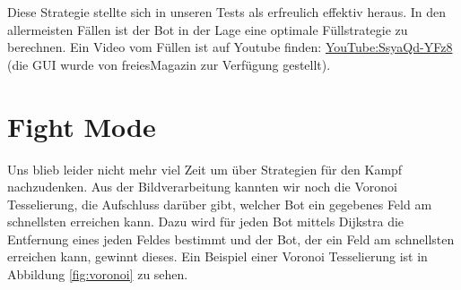 Diese Strategie stellte sich in unseren Tests als erfreulich effektiv heraus.
In den allermeisten Fällen ist der Bot in der Lage eine optimale Füllstrategie zu berechnen.
Ein Video vom Füllen ist auf Youtube finden: \href{https://www.youtube.com/watch?v=SsyaQd-YFz8}{YouTube:SsyaQd-YFz8} (die GUI wurde von freiesMagazin zur Verfügung gestellt).









\section{Fight Mode}
Uns blieb leider nicht mehr viel Zeit um über Strategien für den Kampf nachzudenken.
Aus der Bildverarbeitung kannten wir noch die Voronoi Tesselierung, die Aufschluss darüber gibt, welcher Bot ein gegebenes Feld am schnellsten erreichen kann.
Dazu wird für jeden Bot mittels Dijkstra die Entfernung eines jeden Feldes bestimmt und der Bot, der ein Feld am schnellsten erreichen kann, gewinnt dieses.
Ein Beispiel einer Voronoi Tesselierung ist in Abbildung \ref{fig:voronoi} zu sehen.



